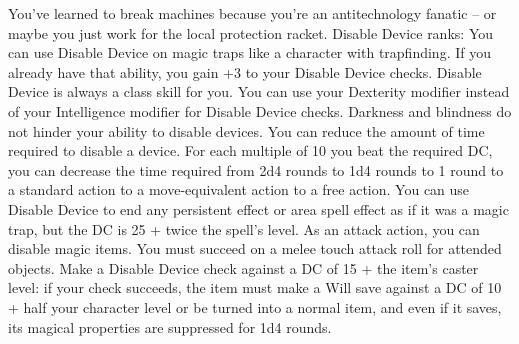 \skillfeat
{You've learned to break machines because you're an antitechnology fanatic -- or maybe you just work for the local protection racket.}
{Disable Device ranks:}
{You can use Disable Device on magic traps like a character with trapfinding. If you already have that ability, you gain +3 to your Disable Device checks. Disable Device is always a class skill for you.}
{You can use your Dexterity modifier instead of your Intelligence modifier for Disable Device checks. Darkness and blindness do not hinder your ability to disable devices.}
{You can reduce the amount of time required to disable a device. For each multiple of 10 you beat the required DC, you can decrease the time required from 2d4 rounds to 1d4 rounds to 1 round to a standard action to a move-equivalent action to a free action.}
{You can use Disable Device to end any persistent effect or area spell effect as if it was a magic trap, but the DC is 25 + twice the spell's level.}
{As an attack action, you can disable magic items. You must succeed on a melee touch attack roll for attended objects. Make a Disable Device check against a DC of 15 + the item's caster level: if your check succeeds, the item must make a Will save against a DC of 10 + half your character level or be turned into a normal item, and even if it saves, its magical properties are suppressed for 1d4 rounds.}